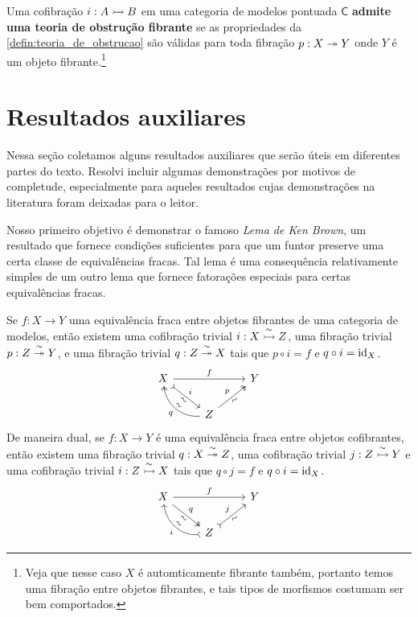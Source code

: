 \begin{defin}\label{defin:teoria_de_obstrucao_fibrante}
  Uma cofibração $i: A \rightarrowtail B$ em uma categoria de modelos pontuada $\mathsf{C}$ \textbf{admite uma teoria de obstrução fibrante} se as propriedades da \cref{defin:teoria_de_obstrucao} são válidas para toda fibração $p: X \twoheadrightarrow Y$ onde $Y$ é um objeto fibrante.\footnote{Veja que nesse caso $X$ é automticamente fibrante também, portanto temos uma fibração entre objetos fibrantes, e tais tipos de morfismos costumam ser bem comportados.}
\end{defin}

\section{Resultados auxiliares}

Nessa seção coletamos alguns resultados auxiliares que serão úteis em diferentes partes do texto.
Resolvi incluir algumas demonstrações por motivos de completude, especialmente para aqueles resultados cujas demonstrações na literatura foram deixadas para o leitor.

Nosso primeiro objetivo é demonstrar o famoso \emph{Lema de Ken Brown}, um resultado que fornece condições suficientes para que um funtor preserve uma certa classe de equivalências fracas.
Tal lema é uma consequência relativamente simples de um outro lema que fornece fatorações especiais para certas equivalências fracas.

\begin{prop}
  \label{prop:lema_de_fatoracao}
  Se $f: X \to Y$ uma equivalência fraca entre objetos fibrantes de uma categoria de modelos, então existem uma cofibração trivial $i: X \overset{\sim}{\rightarrowtail} Z$, uma fibração trivial $p: Z \overset{\sim}{\twoheadrightarrow} Y$, e uma fibração trivial $q: Z \overset{\sim}{\twoheadrightarrow} X$ tais que $p \circ i = f$ e $q \circ i = \mathrm{id}_{X}$.
  \begin{displaymath}
    \begin{tikzcd}
      X
      \arrow[rr, "f"]
      \arrow[rd, tail, "i", "\sim" {swap,sloped}]
      & & Y
      \\ & Z
      \arrow[ru, two heads, "p", "\sim" {swap,sloped}]
      \arrow[lu, two heads, bend left=45, "q", "\sim" {sloped}]
    \end{tikzcd}
  \end{displaymath}
  De maneira dual, se $f: X \to Y$ é uma equivalência fraca entre objetos cofibrantes, então existem uma fibração trivial $q: X \overset{\sim}{\twoheadrightarrow} Z$, uma cofibração trivial $j: Z \overset{\sim}{\rightarrowtail} Y$ e uma cofibração trivial $i: Z \overset{\sim}{\rightarrowtail} X$ tais que $q \circ j = f$ e $q \circ i = \mathrm{id}_{X}$.
  \begin{displaymath}
    \begin{tikzcd}
      X
      \arrow[rr, "f"]
      \arrow[rd, two heads, "q", "\sim" {swap,sloped}]
      & & Y
      \\ & Z
      \arrow[ru, tail, "j", "\sim" {swap,sloped}]
      \arrow[lu, tail, bend left=45, "i", "\sim" {sloped}]
    \end{tikzcd}
  \end{displaymath}
\end{prop}

